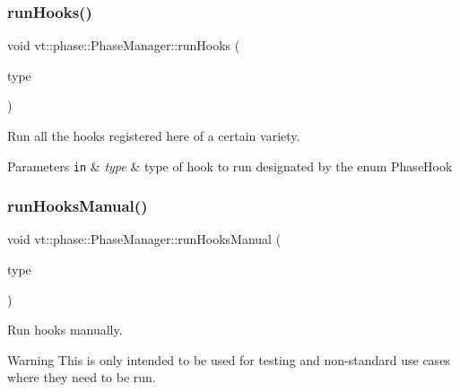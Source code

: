 \subsubsection{\texorpdfstring{run\+Hooks()}{runHooks()}}
{\footnotesize\ttfamily void vt\+::phase\+::\+Phase\+Manager\+::run\+Hooks (\begin{DoxyParamCaption}\item[{\hyperlink{namespacevt_1_1phase_aec9a63fdd99680d7a7fe99d321193811}{Phase\+Hook}}]{type }\end{DoxyParamCaption})\hspace{0.3cm}{\ttfamily [private]}}



Run all the hooks registered here of a certain variety. 


\begin{DoxyParams}[1]{Parameters}
\mbox{\tt in}  & {\em type} & type of hook to run designated by the enum {\ttfamily Phase\+Hook} \\
\hline
\end{DoxyParams}
\mbox{\label{structvt_1_1phase_1_1_phase_manager_ae436f95e5eb570b17c71a48d96675f69}} 
\subsubsection{\texorpdfstring{run\+Hooks\+Manual()}{runHooksManual()}}
{\footnotesize\ttfamily void vt\+::phase\+::\+Phase\+Manager\+::run\+Hooks\+Manual (\begin{DoxyParamCaption}\item[{\hyperlink{namespacevt_1_1phase_aec9a63fdd99680d7a7fe99d321193811}{Phase\+Hook}}]{type }\end{DoxyParamCaption})}



Run hooks manually. 

\begin{DoxyWarning}{Warning}
This is only intended to be used for testing and non-\/standard use cases where they need to be run. 
\end{DoxyWarning}
\mbox{\label{structvt_1_1phase_1_1_phase_manager_a541d1f6c7a350fad979911ac60f38025}} 
